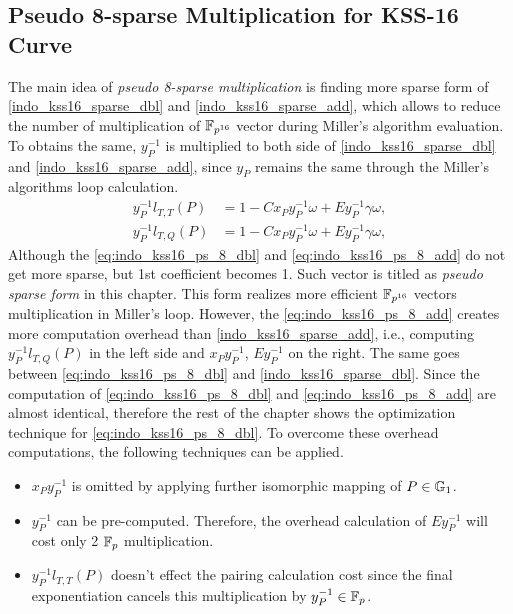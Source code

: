 \subsection{Pseudo 8-sparse Multiplication for KSS-16 Curve}
\label{sec:ch:indo:proposal_8sparse}
The main idea of  \textit{pseudo 8-sparse multiplication} is finding more sparse form  of \eqref{indo_kss16_sparse_dbl} and \eqref{indo_kss16_sparse_add}, which allows to reduce the number of multiplication of $\mathbb{F}_{p^{16}}$ vector during Miller's algorithm evaluation.  To obtains the same, $y_P^{-1}$ is multiplied to both side of  \eqref{indo_kss16_sparse_dbl} and \eqref{indo_kss16_sparse_add}, since $y_P$  remains the same through the Miller's algorithms loop calculation.
\begin{subequations}
\begin{eqnarray}
y_{P}^{-1}l_{T,T}(P)& =  1 -Cx_{P}y_{P}^{-1}\omega+E y_{P}^{-1}\gamma \omega,  \label{eq:indo_kss16_ps_8_dbl}\\
y_{P}^{-1}l_{T,Q}(P)& =  1 -Cx_{P}y_{P}^{-1}\omega+E y_{P}^{-1}\gamma \omega, \label{eq:indo_kss16_ps_8_add}
\end{eqnarray}
\end{subequations}
Although the \eqref{eq:indo_kss16_ps_8_dbl} and \eqref{eq:indo_kss16_ps_8_add} do not get more sparse, but 1st coefficient becomes 1. 
Such vector is titled as \textit{pseudo sparse form} in this chapter. This form realizes more efficient $\mathbb{F}_{p^{16}}$ vectors  multiplication in Miller's loop.  
However, the \eqref{eq:indo_kss16_ps_8_add} creates more computation overhead than \eqref{indo_kss16_sparse_add}, i.e., computing $y_{P}^{-1}l_{T,Q}(P)$ in the left side and $x_Py_{P}^{-1}$, $Ey_P^{-1}$ on the right. 
The same goes between \eqref{eq:indo_kss16_ps_8_dbl} and \eqref{indo_kss16_sparse_dbl}. 
Since the computation of \eqref{eq:indo_kss16_ps_8_dbl} and \eqref{eq:indo_kss16_ps_8_add} are almost identical, therefore the rest of the chapter shows the optimization technique for \eqref{eq:indo_kss16_ps_8_dbl}.
To overcome these overhead computations, the following techniques can be applied.
\begin{itemize}
\item $x_{P}y_{P}^{-1}$ is omitted by applying further isomorphic mapping of $P \in {\mathbb{G}}_{1}$.
\item  $y_P^{-1} $ can be pre-computed. Therefore, the overhead calculation of $Ey_P^{-1}$ will cost only 2 ${\mathbb{F}}_{p}$ multiplication.
\item  $y_{P}^{-1}l_{T,T}(P)$  doesn't effect the pairing calculation cost since the final exponentiation cancels this multiplication by $y_{P}^{-1} \in {\mathbb{F}}_{p}$.
\end{itemize}

